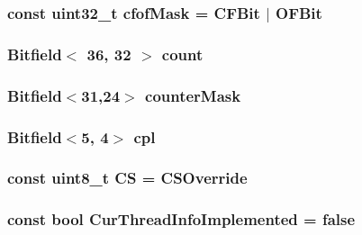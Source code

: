 \label{namespaceX86ISA_a7f54733f0476aea15d4f3590bbe0ce63}
\hypertarget{namespaceX86ISA_a15a21dfb18ead541de5ffe79c5d26e2d}{
\subsubsection[{cfofMask}]{\setlength{\rightskip}{0pt plus 5cm}const {\bf uint32\_\-t} {\bf cfofMask} = CFBit $|$ OFBit}}
\label{namespaceX86ISA_a15a21dfb18ead541de5ffe79c5d26e2d}
\hypertarget{namespaceX86ISA_a668f84c330035fdb72824eb18e09cd09}{
\subsubsection[{count}]{\setlength{\rightskip}{0pt plus 5cm}Bitfield$<$ 36, 32 $>$ {\bf count}}}
\label{namespaceX86ISA_a668f84c330035fdb72824eb18e09cd09}
\hypertarget{namespaceX86ISA_a23736316ac827224f0c4d881d9c2d859}{
\subsubsection[{counterMask}]{\setlength{\rightskip}{0pt plus 5cm}Bitfield$<$31,24$>$ {\bf counterMask}}}
\label{namespaceX86ISA_a23736316ac827224f0c4d881d9c2d859}
\hypertarget{namespaceX86ISA_a5ec16f9134b8d16f25ff0c2d1723f354}{
\subsubsection[{cpl}]{\setlength{\rightskip}{0pt plus 5cm}Bitfield$<$5, 4$>$ {\bf cpl}}}
\label{namespaceX86ISA_a5ec16f9134b8d16f25ff0c2d1723f354}
\hypertarget{namespaceX86ISA_a72f9d36f4775bd1aedeea21730333e07}{
\subsubsection[{CS}]{\setlength{\rightskip}{0pt plus 5cm}const uint8\_\-t {\bf CS} = CSOverride}}
\label{namespaceX86ISA_a72f9d36f4775bd1aedeea21730333e07}
\hypertarget{namespaceX86ISA_a9faf3aac879cfa867d4ae15d4119c45e}{
\subsubsection[{CurThreadInfoImplemented}]{\setlength{\rightskip}{0pt plus 5cm}const bool {\bf CurThreadInfoImplemented} = false}}
